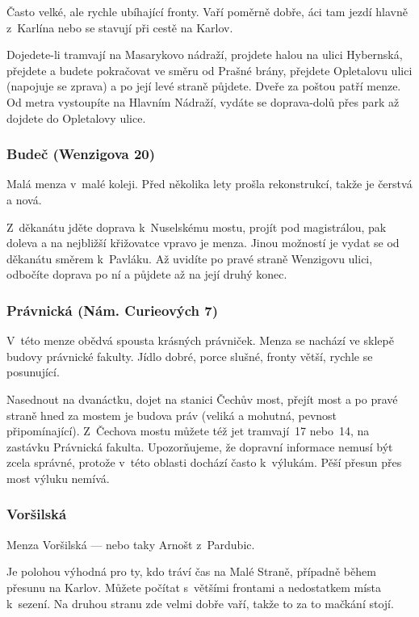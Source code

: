 Často velké, ale rychle ubíhající
fronty. Vaří poměrně dobře, \mfz{}áci tam jezdí hlavně z~Karlína
nebo se stavují při cestě na Karlov.

Dojedete-li tramvají na Masarykovo
nádraží, projdete halou na ulici Hybernská, přejdete a budete
pokračovat ve směru od Prašné brány, přejdete Opletalovu ulici
(napojuje se zprava) a po její levé straně půjdete. Dveře za
poštou patří menze. Od metra vystoupíte na Hlavním Nádraží, vydáte
se doprava-dolů přes park až dojdete do Opletalovy ulice.

\subsubsection{Budeč (Wenzigova 20)} 

Malá menza v~malé koleji. Před
několika lety prošla rekonstrukcí, takže je čerstvá a nová.

Z~děkanátu jděte doprava k~Nuselskému mostu, projít pod magistrálou,
pak doleva a na nejbližší křižovatce vpravo je menza. Jinou
možností je vydat se od děkanátu směrem k~Pavláku. Až uvidíte po
pravé straně Wenzigovu ulici, odbočíte doprava po ní a půjdete až
na její druhý konec.

\subsubsection{Právnická (Nám. Curieových 7)} 

V~této menze obědvá spousta
krásných právniček. Menza se nachází ve sklepě budovy právnické
fakulty. Jídlo dobré, porce slušné, fronty větší, rychle se
posunující. 

Nasednout na
dvanáctku, dojet na stanici Čechův most, přejít most a po pravé
straně hned za mostem je budova práv (veliká a mohutná, pevnost
připomínající). Z~Čechova mostu můžete též jet tramvají~17
nebo~14, na zastávku Právnická fakulta. Upozorňujeme, že dopravní
informace nemusí být zcela správné, protože v~této oblasti dochází
často k~výlukám. Pěší přesun přes most výluku nemívá.

\subsubsection{Voršilská} 
Menza Voršilská --- nebo taky Arnošt z~Pardubic.

Je polohou výhodná pro ty, kdo tráví čas na Malé Straně, případně během přesunu na Karlov. Můžete počítat s~většími frontami a nedostatkem místa k~sezení. Na druhou stranu zde velmi dobře vaří, takže to za to mačkání stojí.

